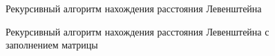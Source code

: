 \documentclass[12pt]{report}
\begin{document}
\begin{figure}[h]
	\caption{Рекурсивный алгоритм нахождения расстояния Левенштейна}
	\label{figure:image}
\end{figure}
\newpage
\begin{figure}[h]
	\caption{Рекурсивный алгоритм нахождения расстояния Левенштейна с заполнением матрицы}
	\label{figure:image}
\end{figure}
\end{document}
